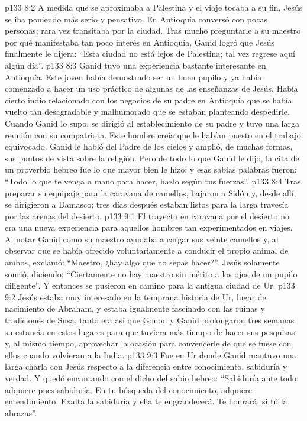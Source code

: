 \vs p133 8:2 A medida que se aproximaba a Palestina y el viaje tocaba a su fin, Jesús se iba poniendo más serio y pensativo. En Antioquía conversó con pocas personas; rara vez transitaba por la ciudad. Tras mucho preguntarle a su maestro por qué manifestaba tan poco interés en Antioquía, Ganid logró que Jesús finalmente le dijera: “Esta ciudad no está lejos de Palestina; tal vez regrese aquí algún día”.
\vs p133 8:3 \pc Ganid tuvo una experiencia bastante interesante en Antioquía. Este joven había demostrado ser un buen pupilo y ya había comenzado a hacer un uso práctico de algunas de las enseñanzas de Jesús. Había cierto indio relacionado con los negocios de su padre en Antioquía que se había vuelto tan desagradable y malhumorado que se estaban planteando despedirle. Cuando Ganid lo supo, se dirigió al establecimiento de su padre y tuvo una larga reunión con su compatriota. Este hombre creía que le habían puesto en el trabajo equivocado. Ganid le habló del Padre de los cielos y amplió, de muchas formas, sus puntos de vista sobre la religión. Pero de todo lo que Ganid le dijo, la cita de un proverbio hebreo fue lo que mayor bien le hizo; y esas sabias palabras fueron: “Todo lo que te venga a mano para hacer, hazlo según tus fuerzas”.
\vs p133 8:4 Tras preparar su equipaje para la caravana de camellos, bajaron a Sidón y, desde allí, se dirigieron a Damasco; tres días después estaban listos para la larga travesía por las arenas del desierto.
\vs p133 9:1 El trayecto en caravana por el desierto no era una nueva experiencia para aquellos hombres tan experimentados en viajes. Al notar Ganid cómo su maestro ayudaba a cargar sus veinte camellos y, al observar que se había ofrecido voluntariamente a conducir el propio animal de ambos, exclamó: “Maestro, ¿hay algo que no sepas hacer?”. Jesús solamente sonrió, diciendo: “Ciertamente no hay maestro sin mérito a los ojos de un pupilo diligente”. Y entonces se pusieron en camino para la antigua ciudad de Ur.
\vs p133 9:2 Jesús estaba muy interesado en la temprana historia de Ur, lugar de nacimiento de Abraham, y estaba igualmente fascinado con las ruinas y tradiciones de Susa, tanto era así que Gonod y Ganid prolongaron tres semanas su estancia en estos lugares para que tuviera más tiempo de hacer sus pesquisas y, al mismo tiempo, aprovechar la ocasión para convencerle de que se fuese con ellos cuando volvieran a la India.
\vs p133 9:3 Fue en Ur donde Ganid mantuvo una larga charla con Jesús respecto a la diferencia entre conocimiento, sabiduría y verdad. Y quedó encantando con el dicho del sabio hebreo: “Sabiduría ante todo; adquiere pues sabiduría. En tu búsqueda del conocimiento, adquiere entendimiento. Exalta la sabiduría y ella te engrandecerá. Te honrará, si tú la abrazas”.
